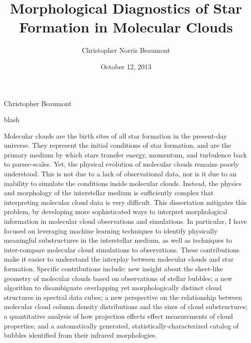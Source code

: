 \documentclass[]{uhthesis}
\begin{document}
\frontmatter

\title{Morphological Diagnostics of Star Formation in Molecular Clouds}
\author{Christopher Norris Beaumont}
\date{October 12, 2013}
\maketitle
\makesig
{}
{Christopher Beaumont}

\makeacknowledgements
blash

\makeabstract
Molecular clouds are the birth sites of all star formation in the present-day universe. They represent the initial conditions of star formation, and are the primary medium by which stars transfer energy, momentum, and turbulence back to parsec-scales. Yet, the physical evolution of molecular clouds remains poorly understood. This is not due to a lack of observational data, nor is it due to an inability to simulate the conditions inside molecular clouds. Instead, the physics and morphology of the interstellar medium is sufficiently complex that interpreting molecular cloud data is very difficult. This dissertation mitigates this problem, by developing more sophisticated ways to interpret morphological information in molecular cloud observations and simulations. In particular, I have focused on leveraging machine learning techniques to identify physically meaningful substructures in the interstellar medium, as well as techniques to inter-compare molecular cloud simulations to observations.  These contributions make it easier to understand the interplay between molecular clouds and star formation. Specific contributions include: new insight about the sheet-like geometry of molecular clouds based on observations of stellar bubbles; a new algorithm to disambiguate overlapping yet morphologically distinct cloud structures in spectral data cubes; a new perspective on the relationship between molecular cloud column density distributions and the sizes of cloud substructures; a quantitative analysis of how projection effects effect measurements of cloud properties; and a automatically generated, statistically-characterized catalog of bubbles identified from their infrared morphologies.

\tableofcontents
\listoftables
\listoffigures

\mainmatter

\end{document}
